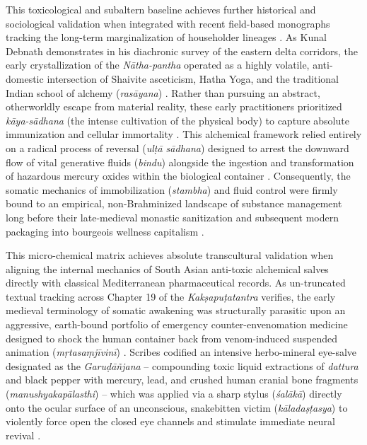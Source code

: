 \documentclass[11pt,twoside,letterpaper]{article}
\begin{document}
This toxicological and subaltern baseline achieves further historical and sociological validation when integrated with recent field-based monographs tracking the long-term marginalization of householder lineages \citep{Debnath2024}. As Kunal Debnath demonstrates in his diachronic survey of the eastern delta corridors, the early crystallization of the \textit{Nātha-pantha} operated as a highly volatile, anti-domestic intersection of Shaivite asceticism, Hatha Yoga, and the traditional Indian school of alchemy (\textit{rasāyana}) \citep{Debnath2024}. Rather than pursuing an abstract, otherworldly escape from material reality, these early practitioners prioritized \textit{kāya-sādhana} (the intense cultivation of the physical body) to capture absolute immunization and cellular immortality \citep{Debnath2024}. This alchemical framework relied entirely on a radical process of reversal (\textit{ulṭā sādhana}) designed to arrest the downward flow of vital generative fluids (\textit{bindu}) alongside the ingestion and transformation of hazardous mercury oxides within the biological container \citep{Debnath2024}. Consequently, the somatic mechanics of immobilization (\textit{stambha}) and fluid control were firmly bound to an empirical, non-Brahminized landscape of substance management long before their late-medieval monastic sanitization and subsequent modern packaging into bourgeois wellness capitalism \citep{Debnath2024, McCartney2021}.

This micro-chemical matrix achieves absolute transcultural validation when aligning the internal mechanics of South Asian anti-toxic alchemical salves directly with classical Mediterranean pharmaceutical records. As un-truncated textual tracking across Chapter 19 of the \textit{Kakṣapuṭatantra} verifies, the early medieval terminology of somatic awakening was structurally parasitic upon an aggressive, earth-bound portfolio of emergency counter-envenomation medicine designed to shock the human container back from venom-induced suspended animation (\textit{mṛtasaṃjīvinī}) \citep{Wujastyk2025}. Scribes codified an intensive herbo-mineral eye-salve designated as the \textit{Garuḍāñjana} -- compounding toxic liquid extractions of \textit{dattura} and black pepper with mercury, lead, and crushed human cranial bone fragments (\textit{manushyakapālasthi}) -- which was applied via a sharp stylus (\textit{śalākā}) directly onto the ocular surface of an unconscious, snakebitten victim (\textit{kāladaṣṭasya}) to violently force open the closed eye channels and stimulate immediate neural revival \citep{Mallinson2007, Wujastyk2025}. 
\end{document}
